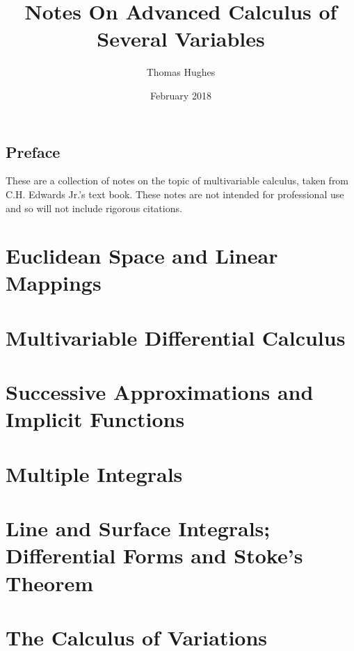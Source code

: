 \documentclass{report}
\title{Notes On Advanced Calculus of Several Variables}
\author{Thomas Hughes}
\date{February 2018}
\begin{document}
\maketitle

\section*{Preface}
These are a collection of notes on the topic of multivariable calculus, taken from C.H. Edwards Jr.'s text book. These notes are not intended for professional use and so will not include rigorous citations. 

\chapter{Euclidean Space and Linear Mappings}


\chapter{Multivariable Differential Calculus}


\chapter{Successive Approximations and Implicit Functions}


\chapter{Multiple Integrals}


\chapter{Line and Surface Integrals; Differential Forms and Stoke's Theorem}


\chapter{The Calculus of Variations}

\end{document}
